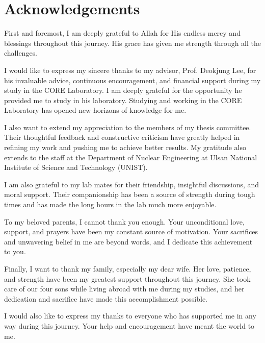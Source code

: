 \section*{\hfill \Large Acknowledgements \hfill}
First and foremost, I am deeply grateful to Allah for His endless mercy and blessings throughout this journey. His grace has given me strength through all the challenges.

I would like to express my sincere thanks to my advisor, Prof. Deokjung Lee, for his invaluable advice, continuous encouragement, and financial support during my study in the CORE Laboratory. I am deeply grateful for the opportunity he provided me to study in his laboratory. Studying and working in the CORE Laboratory has opened new horizons of knowledge for me.

I also want to extend my appreciation to the members of my thesis committee. Their thoughtful feedback and constructive criticism have greatly helped in refining my work and pushing me to achieve better results. My gratitude also extends to the staff at the Department of Nuclear Engineering at Ulsan National Institute of Science and Technology (UNIST).

I am also grateful to my lab mates for their friendship, insightful discussions, and moral support. Their companionship has been a source of strength during tough times and has made the long hours in the lab much more enjoyable. 

To my beloved parents, I cannot thank you enough. Your unconditional love, support, and prayers have been my constant source of motivation. Your sacrifices and unwavering belief in me are beyond words, and I dedicate this achievement to you.

Finally, I want to thank my family, especially my dear wife. Her love, patience, and strength have been my greatest support throughout this journey. She took care of our four sons while living abroad with me during my studies, and her dedication and sacrifice have made this accomplishment possible.

I would also like to express my thanks to everyone who has supported me in any way during this journey. Your help and encouragement have meant the world to me.
\clearpage